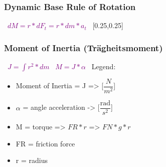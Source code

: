 \documentclass[main.tex,fontsize=8pt,paper=a4,paper=portrait,DIV=calc,]{scrartcl}
\begin{document}
\begin{multicols*}{2}
\subsubsection{Dynamic Base Rule of Rotation}
\, \newline
\large \textcolor{purple}{\( dM = r * dF_t = r * dm * a_t \)}\newline
\, \newline
\normalsize 
{}[0.25,0.25]

\subsubsection{Moment of Inertia (Trägheitsmoment)}
\, \newline
\large \textcolor{purple}{\( J = \int{r^2 * dm} \)}\newline
\, \newline
\large \textcolor{purple}{\( M = J * \alpha \)}
\, \newline
\normalsize Legend: \newline
\begin{itemize}
  \item Moment of Inertia = J => [\( \dfrac{N}{m^2} \)]
  \item \( \alpha \) = angle acceleration -> [\( \dfrac{\text{rad}}{s^2}\)]
\item M = torque => \( FR * r \) => \( FN * g * r\)
\item FR = friction force
\item r = radius
\end{itemize}


\end{multicols*}
\end{document}

